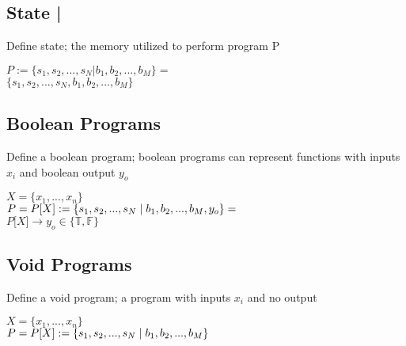 \documentclass[11pt]{article}
\begin{document}
\subsection{State |}
Define state; the memory utilized to perform program P
\begin{center}
$
P := \{ s_1, s_2,...,s_{N} | b_1, b_2,...,b_M\} =
$
\\ \vspace{2mm}
$
\{ s_1, s_2,...,s_{N}, b_1, b_2,...,b_M\}
$
\end{center}





\subsection{Boolean Programs}
Define a boolean program; boolean programs can represent functions with inputs $x_i$ and boolean output $y_o$
\begin{center}
$
X = \{x_1,...,x_n\}
$
\\ \vspace{2mm}
$P = P\lbrack X \rbrack := \{ s_1,s_2,...,s_{N}\hspace{1mm}|\hspace{1mm} b_1, b_2,...,b_M,y_o\}=$
\\ \vspace{2mm}
$
P\lbrack X \rbrack \rightarrow y_o \in \{ \mathbb{T},\mathbb{F}\}
$
\end{center}





\subsection{Void Programs}
Define a void program; a program with inputs $x_i$ and no output
\begin{center}
$
X = \{x_1,...,x_n\}
$
\\ \vspace{2mm}
$P = P\lbrack X \rbrack := \{ s_1,s_2,...,s_{N}\hspace{1mm}|\hspace{1mm} b_1, b_2,...,b_M\}$
\end{center}
\end{document}
